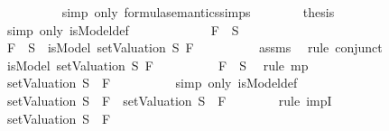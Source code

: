 \begin{isabellebody}
\ \ \ \ \ \ \ \ \isamarkupfalse%
\ {\isacharparenleft}simp\ only{\isacharcolon}\ formula{\isacharunderscore}semantics{\isachardot}simps{\isacharparenleft}{}{\isacharparenright}{\isacharparenright}\isanewline
\ \ \ \ \ \ \isamarkupfalse%
\ {\isacharquery}thesis\isanewline
\ \ \ \ \ \ \ \ \isamarkupfalse%
\ {\isacharparenleft}simp\ only{\isacharcolon}\ isModel{\isacharunderscore}def{\isacharparenright}\isanewline
\ \ \ \ \isamarkupfalse%
\isanewline
\ \ \ \ \ \ \isamarkupfalse%
\ {\isachardoublequoteopen}F{}\ {\isasymin}\ S{\isachardoublequoteclose}\isanewline
\ \ \ \ \ \ \isamarkupfalse%
\ {\isachardoublequoteopen}F{}\ {\isasymin}\ S\ {\isasymlongrightarrow}\ isModel\ {\isacharparenleft}setValuation\ S{\isacharparenright}\ F{}{\isachardoublequoteclose}\isanewline
\ \ \ \ \ \ \ \ \isamarkupfalse%
\ assms{\isacharparenleft}{}{\isacharparenright}\ \isamarkupfalse%
\ {\isacharparenleft}rule\ conjunct{}{\isacharparenright}\isanewline
\ \ \ \ \ \ \isamarkupfalse%
\ \isamarkupfalse%
\ {\isachardoublequoteopen}isModel\ {\isacharparenleft}setValuation\ S{\isacharparenright}\ F{}{\isachardoublequoteclose}\isanewline
\ \ \ \ \ \ \ \ \isamarkupfalse%
\ {\isacartoucheopen}F{}\ {\isasymin}\ S{\isacartoucheclose}\ \isamarkupfalse%
\ {\isacharparenleft}rule\ mp{\isacharparenright}\isanewline
\ \ \ \ \ \ \isamarkupfalse%
\ \isamarkupfalse%
\ {\isachardoublequoteopen}{\isacharparenleft}setValuation\ S{\isacharparenright}\ {\isasymTurnstile}\ F{}{\isachardoublequoteclose}\isanewline
\ \ \ \ \ \ \ \ \isamarkupfalse%
\ {\isacharparenleft}simp\ only{\isacharcolon}\ isModel{\isacharunderscore}def{\isacharparenright}\isanewline
\ \ \ \ \ \ \isamarkupfalse%
\ {\isachardoublequoteopen}{\isacharparenleft}setValuation\ S{\isacharparenright}\ {\isasymTurnstile}\ F{}\ {\isasymlongrightarrow}\ {\isacharparenleft}setValuation\ S{\isacharparenright}\ {\isasymTurnstile}\ F{}{\isachardoublequoteclose}\isanewline
\ \ \ \ \ \ \isamarkupfalse%
\ {\isacharparenleft}rule\ impI{\isacharparenright}\isanewline
\ \ \ \ \ \ \ \ \isamarkupfalse%
\ {\isachardoublequoteopen}{\isacharparenleft}setValuation\ S{\isacharparenright}\ {\isasymTurnstile}\ F{}{\isachardoublequoteclose}\isanewline

\end{isabellebody}
